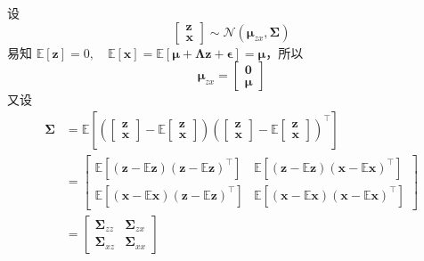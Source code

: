 		设 
		\begin{equation*}
			\begin{bmatrix}
				\bm{z} \\
				\bm{x} 
			\end{bmatrix}
			\sim \mathcal{N}(\bm{\mu}_{zx}, \bm{\Sigma})
		\end{equation*}
		易知 $ \mathbb{E}[\bm{z}] = 0, \quad \mathbb{E}[\bm{x}] = \mathbb{E}[\bm{\mu} + \bm{\Lambda z} + \bm{\epsilon}] = \bm{\mu} $，所以
		\begin{equation*}
			\bm{\mu}_{zx} = 
			\begin{bmatrix}
				\bm{0} \\
				\bm{\mu}
			\end{bmatrix}
		\end{equation*}
		又设
		\begin{align*}
			\bm{\Sigma} &= \mathbb{E} 
			\left[  
				\left( 
					\begin{bmatrix}
						\bm{z} \\
						\bm{x}
					\end{bmatrix}
					- \mathbb{E} 
					\begin{bmatrix}
						\bm{z} \\
						\bm{x}
					\end{bmatrix}
				\right)
				\left( 
					\begin{bmatrix}
						\bm{z} \\
						\bm{x}
					\end{bmatrix}
					- \mathbb{E} 
					\begin{bmatrix}
						\bm{z} \\
						\bm{x}
					\end{bmatrix}
				\right)^\intercal
			\right] \\
			&= \begin{bmatrix}
				\mathbb{E}\left[ (\bm{z} - \mathbb{E}\bm{z}) (\bm{z} - \mathbb{E}\bm{z})^\intercal \right]  & \mathbb{E}\left[ (\bm{z} - \mathbb{E}\bm{z}) (\bm{x} - \mathbb{E}\bm{x})^\intercal \right] \\
				\mathbb{E}\left[ (\bm{x} - \mathbb{E}\bm{x}) (\bm{z} - \mathbb{E}\bm{z})^\intercal \right] & \mathbb{E}\left[ (\bm{x} - \mathbb{E}\bm{x}) (\bm{x} - \mathbb{E}\bm{x})^\intercal \right]
			\end{bmatrix} \\
			&= \begin{bmatrix}
				\bm{\Sigma}_{zz} & \bm{\Sigma}_{zx} \\
				\bm{\Sigma}_{xz} & \bm{\Sigma}_{xx}
			\end{bmatrix}
		\end{align*}

